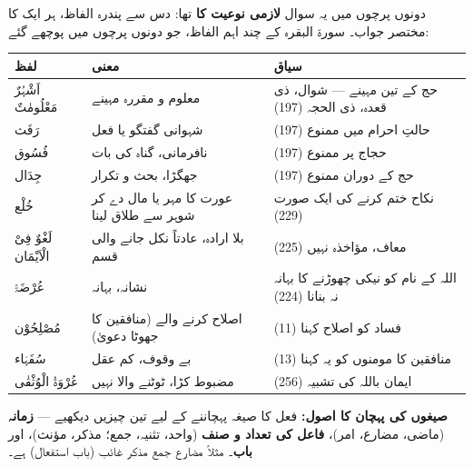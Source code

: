 \begin{hal}
دونوں پرچوں میں یہ سوال \textbf{لازمی نوعیت کا} تھا: دس سے پندرہ الفاظ، ہر ایک
کا مختصر جواب۔ سورۃ البقرہ کے چند اہم الفاظ، جو دونوں پرچوں میں پوچھے گئے:

\medskip
\begin{center}
\begin{tabular}{@{}p{2.6cm} p{5.4cm} p{5.6cm}@{}}
\toprule
\textbf{لفظ} & \textbf{معنی} & \textbf{سیاق} \\
\midrule
اَشْہُرٌ مَعْلُومٰتٌ & معلوم و مقررہ مہینے & حج کے تین مہینے --- شوال، ذی
  قعدہ، ذی الحجہ (\textenglish{197}) \\
رَفَث & شہوانی گفتگو یا فعل & حالتِ احرام میں ممنوع (\textenglish{197}) \\
فُسُوق & نافرمانی، گناہ کی بات & حجاج پر ممنوع (\textenglish{197}) \\
جِدَال & جھگڑا، بحث و تکرار & حج کے دوران ممنوع (\textenglish{197}) \\
خُلْع & عورت کا مہر یا مال دے کر
  شوہر سے طلاق لینا & نکاح ختم کرنے کی ایک صورت (\textenglish{229}) \\
لَغْوٌ فِیْ الْاَیْمَان & بلا ارادہ، عادتاً نکل جانے والی قسم & معاف، مؤاخذہ
  نہیں (\textenglish{225}) \\
عُرْضَۃً & نشانہ، بہانہ & اللہ کے نام کو نیکی چھوڑنے کا بہانہ نہ بنانا
  (\textenglish{224}) \\
مُصْلِحُوْن & اصلاح کرنے والے (منافقین کا جھوٹا دعویٰ) & فساد کو اصلاح کہنا
  (\textenglish{11}) \\
سُفَہَاء & بے وقوف، کم عقل & منافقین کا مومنوں کو یہ کہنا (\textenglish{13}) \\
عُرْوَۃُ الْوُثْقٰی & مضبوط کڑا، ٹوٹنے والا نہیں & ایمان باللہ کی تشبیہ
  (\textenglish{256}) \\
\bottomrule
\end{tabular}
\end{center}

\smallskip
\textbf{صیغوں کی پہچان کا اصول:} فعل کا صیغہ پہچاننے کے لیے تین چیزیں دیکھیے
--- \textbf{زمانہ} (ماضی، مضارع، امر)، \textbf{فاعل کی تعداد و صنف} (واحد،
تثنیہ، جمع؛ مذکر، مؤنث)، اور \textbf{باب}۔ مثلاً  مضارع
جمع مذکر غائب (باب استفعال) ہے۔
\end{hal}